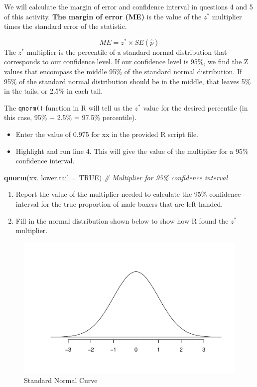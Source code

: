\documentclass[
]{report}
\newenvironment{Shaded}{\begin{snugshade}}{\end{snugshade}}
\newcommand{\AttributeTok}[1]{\textcolor[rgb]{0.13,0.29,0.53}{#1}}
\newcommand{\CommentTok}[1]{\textcolor[rgb]{0.56,0.35,0.01}{\textit{#1}}}
\newcommand{\ConstantTok}[1]{\textcolor[rgb]{0.56,0.35,0.01}{#1}}
\newcommand{\FunctionTok}[1]{\textcolor[rgb]{0.13,0.29,0.53}{\textbf{#1}}}
\newcommand{\NormalTok}[1]{#1}
\begin{document}
\vspace{0.3in}
\newpage

We will calculate the margin of error and confidence interval in questions 4 and 5 of this activity. \textbf{The margin of error (ME)} is the value of the \(z^*\) multiplier times the standard error of the statistic.

\[ME = z^* \times SE(\hat{p})\]
The \(z^*\) multiplier is the percentile of a standard normal distribution that corresponds to our confidence level. If our confidence level is 95\%, we find the Z values that encompass the middle 95\% of the standard normal distribution. If 95\% of the standard normal distribution should be in the middle, that leaves 5\% in the tails, or 2.5\% in each tail.

The \texttt{qnorm()} function in R will tell us the \(z^*\) value for the desired percentile (in this case, 95\% + 2.5\% = 97.5\% percentile).

\begin{itemize}
\item
  Enter the value of 0.975 for xx in the provided R script file.
\item
  Highlight and run line 4. This will give the value of the multiplier for a 95\% confidence interval.
\end{itemize}

\begin{Shaded}
\begin{Highlighting}[]
\FunctionTok{qnorm}\NormalTok{(xx. }\AttributeTok{lower.tail =} \ConstantTok{TRUE}\NormalTok{) }\CommentTok{\# Multiplier for 95\% confidence interval}
\end{Highlighting}
\end{Shaded}

\begin{enumerate}
\def\labelenumi{\arabic{enumi}.}
\setcounter{enumi}{1}
\item
  Report the value of the multiplier needed to calculate the 95\% confidence interval for the true proportion of male boxers that are left-handed.
  \vspace{0.2in}
\item
  Fill in the normal distribution shown below to show how R found the \(z^*\) multiplier.
\end{enumerate}

\begin{figure}

{\centering \includegraphics[width=0.45\linewidth]{07-A06-inference-1cat_CI-theory_files/figure-latex/Normalcur-1} 

}

\caption{Standard Normal Curve}\label{fig:Normalcur}
\end{figure}
\end{document}
